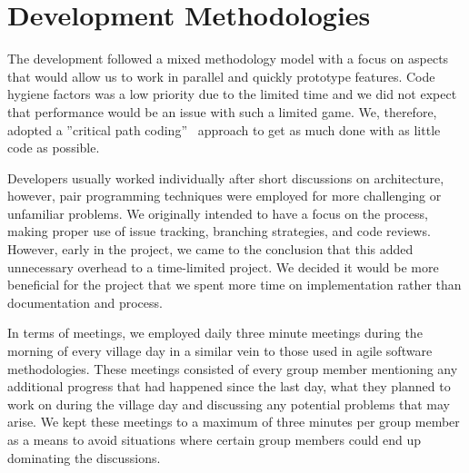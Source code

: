 \section{Development Methodologies}
The development followed a mixed methodology model with a focus on aspects that would allow us to work in parallel and quickly prototype features. Code hygiene factors was a low priority due to the limited time and we did not expect that performance would be an issue with such a limited game. We, therefore, adopted a ''critical path coding''~\cite{critical_path_coding} approach to get as much done with as little code as possible.

Developers usually worked individually after short discussions on architecture, however, pair programming techniques were employed for more challenging or unfamiliar problems. 
We originally intended to have a focus on the process, making proper use of issue tracking, branching strategies, and code reviews. However, early in the project, we came to the conclusion that this added unnecessary overhead to a time-limited project. We decided it would be more beneficial for the project that we spent more time on implementation rather than documentation and process.

In terms of meetings, we employed daily three minute meetings during the morning of every village day in a similar vein to those used in agile software methodologies. These meetings consisted of every group member mentioning any additional progress that had happened since the last day, what they planned to work on during the village day and discussing any potential problems that may arise. We kept these meetings to a maximum of three minutes per group member as a means to avoid situations where certain group members could end up dominating the discussions.